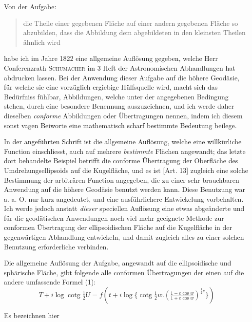 \indent Von der Aufgabe:
\begin{quote}
die Theile einer gegebenen Fläche auf einer andern gegebenen Fläche so abzubilden, dass die Abbildung dem abgebildeten in den kleinsten Theilen ähnlich wird
\end{quote}
\noindent habe ich im Jahre 1822 eine allgemeine Auflösung gegeben, welche Herr Conferenzrath \textsc{Schumacher} im 3 Heft der Astronomischen Abhandlungen hat abdrucken lassen. Bei der Anwendung dieser Aufgabe auf die höhere Geodäsie, für welche sie eine vorzüglich ergiebige Hülfsquelle wird, macht sich das Bedürfniss fühlbar, Abbildungen, welche unter der angegebenen Bedingung stehen, durch eine besondere Benennung auszuzeichnen, und ich werde daher dieselben \textit{conforme} Abbildungen oder Übertragungen nennen, indem ich diesem sonst vagen Beiworte eine mathematisch scharf bestimmte Bedeutung beilege.

In der angeführten Schrift ist die allgemeine Auflösung, welche eine willkürliche Function einschliesst, auch auf mehrere \textit{bestimmte} Flächen angewandt; das letzte dort behandelte Beispiel betrifft die conforme Übertragung der Oberfläche des Umdrehungsellipsoids auf die Kugelfläche, und es ist [Art. 13] zugleich eine solche Bestimmung der arbiträren Function angegeben, die zu einer sehr brauchbaren Anwendung auf die höhere Geodäsie benutzt werden kann. Diese Benutzung war a. a. O. nur kurz angedeutet, und eine ausführlichere Entwickelung vorbehalten. Ich werde jedoch anstatt \textit{dieser} speciellen Auflösung eine etwas abgeänderte und für die geodätischen Anwendungen noch viel mehr geeignete Methode zur conformen Übertragung der ellipsoidischen Fläche auf die Kugelfläche in der gegenwärtigen Abhandlung entwickeln, und damit zugleich alles zu einer solchen Benutzung erforderliche verbinden.

\indent Die allgemeine Auflösung der Aufgabe, angewandt auf die ellipsoidische und sphärische Fläche, gibt folgende alle conformen Übertragungen der einen auf die andere umfassende Formel (1):
\[
T+i\log\operatorname{cotg}\tfrac{1}{2}U=f(t+i\log\{\operatorname{cotg}\tfrac{1}{2}w\mathord{.}(\tfrac{1-e\cos w}{1+e\cos w})^{\frac{1}{2}e}\})
\]

Es bezeichnen hier
